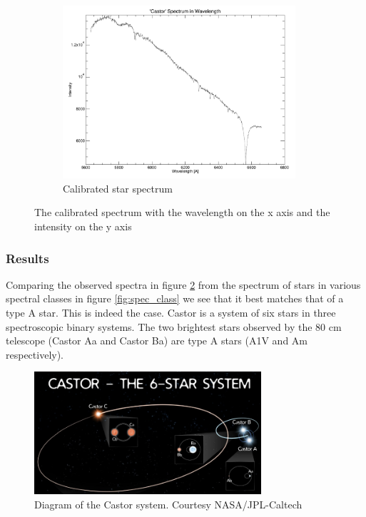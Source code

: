 \documentclass[12pt,a4paper]{article}
\begin{document}
\begin{enumerate}
\begin{figure}[H]
\begin{subfigure}{0.49\textwidth}
                \end{subfigure}
                \begin{subfigure}{0.49\textwidth}
                  \centering
                  \includegraphics[width=3.4in]{Pictures/Castor_121sec_2025_2-Spectrum.pdf}
                  \caption{Calibrated star spectrum}
                  \label{fig:calibrated_starspec}
                \end{subfigure}
                \caption{The calibrated spectrum with the wavelength on the x axis and the intensity on the y axis}
              \end{figure}
      \end{enumerate}

    \subsubsection{Results}
      Comparing the observed spectra in figure \ref{fig:calibrated_starspec} from the spectrum of stars in various spectral classes in figure \ref{fig:spec_class} we see that it best matches that of a 
      type A star. This is indeed the case. Castor is a system of six stars in three spectroscopic binary systems. The two brightest stars observed by the 80 cm telescope (Castor Aa and Castor Ba) are type A stars (A1V and Am respectively).\cite{Wikipedia_contributors_2025}\cite{Pourbaix_Tokovinin_Batten_Fekel_Hartkopf_Levato_Morrell_Torres_Udry_2004}
      \begin{figure}[H]
        \centering
        \includegraphics[width=0.75\textwidth]{Pictures/Castor.png}
        \caption{Diagram of the Castor system. Courtesy NASA/JPL-Caltech\cite{Wikipedia_contributors_2025}\cite{Castor}}
        \label{fig:comparison}
      \end{figure}
\end{document}
